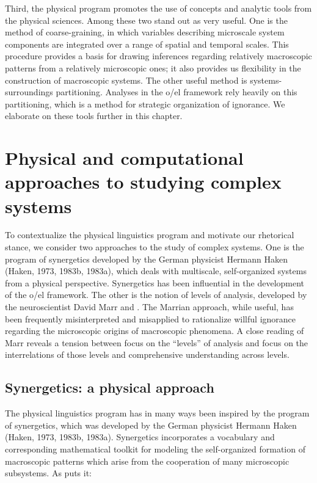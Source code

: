   Third, the physical program promotes the use of concepts and analytic tools from the physical sciences. Among these two stand out as very useful. One is the method of coarse-graining, in which variables describing microscale system components are integrated over a range of spatial and temporal scales. This procedure provides a basis for drawing inferences regarding relatively macroscopic patterns from a relatively microscopic ones; it also provides us flexibility in the construction of macroscopic systems. The other useful method is systems-surroundings partitioning. Analyses in the o/el framework rely heavily on this partitioning, which is a method for strategic organization of ignorance. We elaborate on these tools further in this chapter.

\section{Physical and computational approaches to studying complex systems}

To contextualize the physical linguistics program and motivate our rhetorical stance, we consider two approaches to the study of complex systems. One is the program of synergetics developed by the German physicist Hermann Haken (Haken, 1973, 1983b, 1983a), which deals with multiscale, self-organized systems from a physical perspective. Synergetics has been influential in the development of the o/el framework. The other is the notion of levels of analysis, developed by the neuroscientist David Marr \citep{MarrPoggio1977} and \citep{Marr1982}. The Marrian approach, while useful, has been frequently misinterpreted and misapplied to rationalize willful ignorance regarding the microscopic origins of macroscopic phenomena. A close reading of Marr reveals a tension between focus on the “levels” of analysis and focus on the interrelations of those levels and comprehensive understanding across levels.

\subsection{Synergetics: a physical approach}

The physical linguistics program has in many ways been inspired by the program of synergetics, which was developed by the German physicist Hermann Haken (Haken, 1973, 1983b, 1983a). Synergetics incorporates a vocabulary and corresponding mathematical toolkit for modeling the self-organized formation of macroscopic patterns which arise from the cooperation of many microscopic subsystems. As \citet{Haken1973} puts it:

